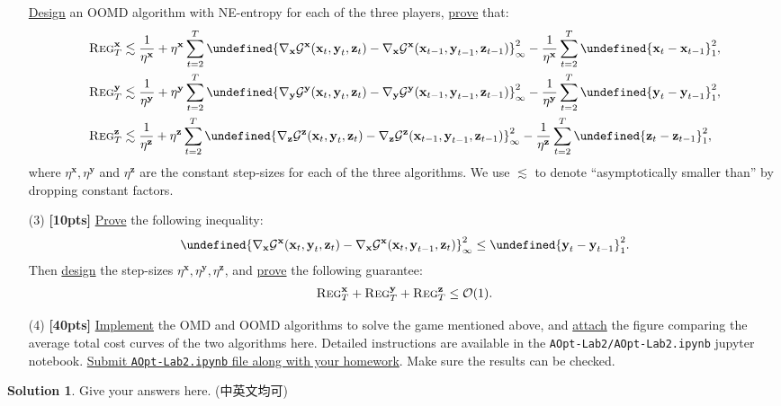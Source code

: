 \documentclass[a4paper]{article}
\numberwithin{equation}{section}
\theoremstyle{definition}
\newtheorem*{solution}{Solution}
\theoremstyle{definition}
\def \O {\mathcal{O}}
\def \x {\textbf{x}}
\def \y {\textbf{y}}
\def \z {\textbf{z}}
\def \Gx {\mathcal{G}^\x}
\def \Gy {\mathcal{G}^\y}
\def \Gz {\mathcal{G}^\z}
\def \reg {\textsc{Reg}}
\let\norm\undefined
\DeclarePairedDelimiter\norm{\lVert}{\rVert}
\begin{document}
\begin{enumerate}
  \underline{Design} an OOMD algorithm with NE-entropy for each of the three players, \underline{prove} that:
  \begin{align*}
    \reg_T^\x &\lesssim \frac{1}{\eta^\x} + \eta^\x \sum_{t=2}^{T}\norm{\nabla_\x \Gx(\x_t,\y_t,\z_t) - \nabla_\x \Gx(\x_{t-1},\y_{t-1},\z_{t-1})}_\infty^2 - \frac{1}{\eta^\x}\sum_{t=2}^{T}\norm{\x_t - \x_{t-1}}_1^2, \\
    \reg_T^\y &\lesssim \frac{1}{\eta^\y} + \eta^\y \sum_{t=2}^{T}\norm{\nabla_\y \Gy(\x_t,\y_t,\z_t) - \nabla_\y \Gy(\x_{t-1},\y_{t-1},\z_{t-1})}_\infty^2 - \frac{1}{\eta^\y}\sum_{t=2}^{T}\norm{\y_t - \y_{t-1}}_1^2, \\
    \reg_T^\z &\lesssim \frac{1}{\eta^\z} + \eta^\z \sum_{t=2}^{T}\norm{\nabla_\z \Gz(\x_t,\y_t,\z_t) - \nabla_\z \Gz(\x_{t-1},\y_{t-1},\z_{t-1})}_\infty^2 - \frac{1}{\eta^\z}\sum_{t=2}^{T}\norm{\z_t - \z_{t-1}}_1^2, 
  \end{align*}
  where $\eta^\x,\eta^\y$ and $\eta^\z$ are the constant step-sizes for each of the three algorithms. We use $\lesssim$ to denote ``asymptotically smaller than'' by dropping constant factors.
  \item[(3)] \textbf{[10pts]} \underline{Prove} the following inequality:
    \begin{align*}
        \norm{\nabla_\x \Gx(\x_t,\y_t,\z_t) - \nabla_\x \Gx(\x_t,\y_{t-1},\z_{t})}_\infty^2 \le \norm{\y_t - \y_{t-1}}_1^2.
    \end{align*}
    Then \underline{design} the step-sizes $\eta^\x,\eta^\y,\eta^\z$, and \underline{prove} the following guarantee:
    \begin{align*}
        \reg_T^\x + \reg_T^\y + \reg_T^\z \le \O(1).
    \end{align*}
  \item[(4)] \textbf{[40pts]}  \underline{Implement} the OMD and OOMD algorithms to solve the game mentioned above, and \underline{attach} the figure comparing the average total cost curves of the two algorithms here. Detailed instructions are available in the \texttt{AOpt-Lab2/AOpt-Lab2.ipynb} jupyter notebook. \underline{Submit \texttt{AOpt-Lab2.ipynb} file along with your homework}. Make sure the results can be checked.
\end{enumerate}
\begin{solution}
  Give your answers here. (中英文均可)
  ~\\
  ~\\
  ~\\
\end{solution}
\end{document}
